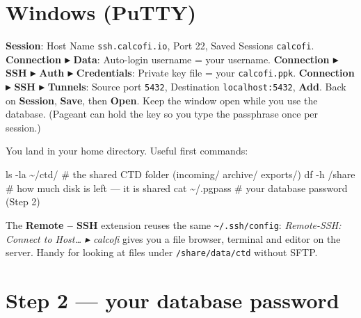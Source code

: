 \documentclass[
  letterpaper,
  DIV=11,
  numbers=noendperiod]{scrreprt}
\newenvironment{Shaded}{\begin{snugshade}}{\end{snugshade}}
\newcommand{\AttributeTok}[1]{\textcolor[rgb]{0.40,0.45,0.13}{#1}}
\newcommand{\CommentTok}[1]{\textcolor[rgb]{0.37,0.37,0.37}{#1}}
\newcommand{\FunctionTok}[1]{\textcolor[rgb]{0.28,0.35,0.67}{#1}}
\newcommand{\NormalTok}[1]{\textcolor[rgb]{0.00,0.23,0.31}{#1}}
\begin{document}
\section{Windows (PuTTY)}

\textbf{Session}: Host Name \texttt{ssh.calcofi.io}, Port 22, Saved
Sessions \texttt{calcofi}. \textbf{Connection ▸ Data}: Auto-login
username = your username. \textbf{Connection ▸ SSH ▸ Auth ▸
Credentials}: Private key file = your \texttt{calcofi.ppk}.
\textbf{Connection ▸ SSH ▸ Tunnels}: Source port \texttt{5432},
Destination \texttt{localhost:5432}, \textbf{Add}. Back on
\textbf{Session}, \textbf{Save}, then \textbf{Open}. Keep the window
open while you use the database. (Pageant can hold the key so you type
the passphrase once per session.)

You land in your home directory. Useful first commands:

\begin{Shaded}
\begin{Highlighting}[]
\FunctionTok{ls} \AttributeTok{{-}la}\NormalTok{ \textasciitilde{}/ctd/          }\CommentTok{\# the shared CTD folder (incoming/ archive/ exports/)}
\FunctionTok{df} \AttributeTok{{-}h}\NormalTok{ /share           }\CommentTok{\# how much disk is left — it is shared}
\FunctionTok{cat}\NormalTok{ \textasciitilde{}/.pgpass          }\CommentTok{\# your database password (Step 2)}
\end{Highlighting}
\end{Shaded}

\begin{tcolorbox}[enhanced jigsaw, arc=.35mm, colback=white, left=2mm, leftrule=.75mm, titlerule=0mm, bottomrule=.15mm, colbacktitle=quarto-callout-tip-color!10!white, colframe=quarto-callout-tip-color-frame, rightrule=.15mm, title=\textcolor{quarto-callout-tip-color}{\faLightbulb}\hspace{0.5em}{VS Code}, breakable, opacityback=0, toptitle=1mm, toprule=.15mm, coltitle=black, bottomtitle=1mm, opacitybacktitle=0.6]

The \textbf{Remote -- SSH} extension reuses the same
\texttt{\textasciitilde{}/.ssh/config}: \emph{Remote-SSH: Connect to
Host\ldots{} ▸ calcofi} gives you a file browser, terminal and editor on
the server. Handy for looking at files under \texttt{/share/data/ctd}
without SFTP.

\end{tcolorbox}

\section{Step 2 --- your database password}\label{sec-pgpass}
\end{document}
